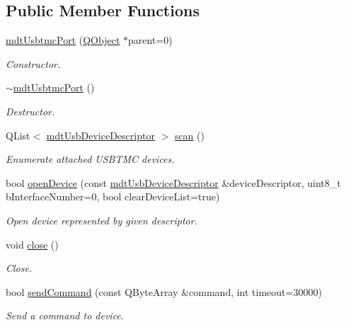 \subsection*{Public Member Functions}
\begin{DoxyCompactItemize}
\item 
\hyperlink{classmdt_usbtmc_port_a102a2d5ebad4968621812e682d9d1b71}{mdt\-Usbtmc\-Port} (\hyperlink{class_q_object}{Q\-Object} $\ast$parent=0)
\begin{DoxyCompactList}\small\item\em Constructor. \end{DoxyCompactList}\item 
\hyperlink{classmdt_usbtmc_port_a3f9d3f1f40f61e17fa2997f3ad181d30}{$\sim$mdt\-Usbtmc\-Port} ()
\begin{DoxyCompactList}\small\item\em Destructor. \end{DoxyCompactList}\item 
Q\-List$<$ \hyperlink{classmdt_usb_device_descriptor}{mdt\-Usb\-Device\-Descriptor} $>$ \hyperlink{classmdt_usbtmc_port_a8f555cd150a82b74322e2f109bb094f4}{scan} ()
\begin{DoxyCompactList}\small\item\em Enumerate attached U\-S\-B\-T\-M\-C devices. \end{DoxyCompactList}\item 
bool \hyperlink{classmdt_usbtmc_port_abe30ec243e9dbf3de49cb1d9be5e1a16}{open\-Device} (const \hyperlink{classmdt_usb_device_descriptor}{mdt\-Usb\-Device\-Descriptor} \&device\-Descriptor, uint8\-\_\-t b\-Interface\-Number=0, bool clear\-Device\-List=true)
\begin{DoxyCompactList}\small\item\em Open device represented by given descriptor. \end{DoxyCompactList}\item 
void \hyperlink{classmdt_usbtmc_port_a6fec5e49a42e6c2e6202a8b2f7f0dc37}{close} ()
\begin{DoxyCompactList}\small\item\em Close. \end{DoxyCompactList}\item 
bool \hyperlink{classmdt_usbtmc_port_ad03633a2c6289974d79f361c6dbba5af}{send\-Command} (const Q\-Byte\-Array \&command, int timeout=30000)
\begin{DoxyCompactList}\small\item\em Send a command to device. \end{DoxyCompactList}\item 

\end{DoxyCompactItemize}
